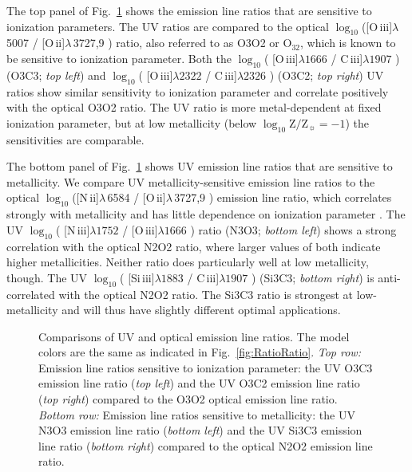 \documentclass[preprint2]{aastex61}
\newcommand{\nii}{[N\,{\sc ii}]\xspace}
\newcommand{\niii}{[N\,{\sc iii}]\xspace}
\newcommand{\oiii}{[O\,{\sc iii}]\xspace}
\newcommand{\oii}{[O\,{\sc ii}]\xspace}
\newcommand{\SiuIII}{[Si\,{\sc iii}]\xspace}
\newcommand{\ciii}{C\,{\sc iii}]\xspace}
\newcommand{\logten}{\ensuremath{\log_{10}}}
\newcommand{\logZeq}[1]{\ensuremath{\logten \mathrm{Z}/\mathrm{Z}_{\sun} = #1}}
\begin{document}
The top panel of Fig.~\ref{fig:UVopt} shows the emission line ratios that are sensitive to ionization parameters. The UV ratios are compared to the optical $\log_{10}$(\oiii$\lambda\,$5007 / \oii$\lambda\,$3727,9 ) ratio, also referred to as O3O2 or O$_{32}$, which is known to be sensitive to ionization parameter. Both the $\log_{10}$( \oiii$\lambda1666$ / \ciii$\lambda1907$ ) (O3C3; \emph{top left}) and $\log_{10}$( \oiii$\lambda2322$ / \ciii$\lambda2326$ ) (O3C2; \emph{top right}) UV ratios show similar sensitivity to ionization parameter and correlate positively with the optical O3O2 ratio. The UV ratio is more metal-dependent at fixed ionization parameter, but at low metallicity (below \logZeq{-1}) the sensitivities are comparable. 

The bottom panel of Fig.~\ref{fig:UVopt} shows UV emission line ratios that are sensitive to metallicity. We compare UV metallicity-sensitive emission line ratios to the optical $\log_{10}$(\nii$\lambda\,$6584 / \oii$\lambda\,$3727,9 ) emission line ratio, which correlates strongly with metallicity and has little dependence on ionization parameter \citep{Kewley+2002}. The UV $\log_{10}$( \niii$\lambda1752$ / \oiii$\lambda1666$ ) ratio (N3O3; \emph{bottom left}) shows a strong correlation with the optical N2O2 ratio, where larger values of both indicate higher metallicities. Neither ratio does particularly well at low metallicity, though. The UV $\log_{10}$( \SiuIII$\lambda1883$ / \ciii$\lambda1907$ ) (Si3C3; \emph{bottom right}) is anti-correlated with the optical N2O2 ratio. The Si3C3 ratio is strongest at low-metallicity and will thus have slightly different optimal applications.

\begin{figure}
  \begin{center}
    \caption{Comparisons of UV and optical emission line ratios. The model colors are the same as indicated in Fig.~\ref{fig:RatioRatio}. \emph{Top row:} Emission line ratios sensitive to ionization parameter: the UV O3C3 emission line ratio (\emph{top left}) and the UV O3C2 emission line ratio (\emph{top right}) compared to the O3O2 optical emission line ratio. \emph{Bottom row:} Emission line ratios sensitive to metallicity: the UV N3O3 emission line ratio (\emph{bottom left}) and the UV Si3C3 emission line ratio (\emph{bottom right}) compared to the optical N2O2 emission line ratio.}
    \label{fig:UVopt}
  \end{center}
\end{figure}
\end{document}
